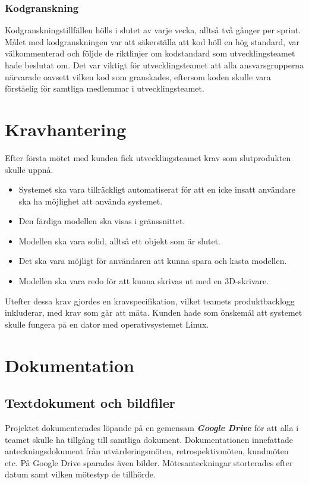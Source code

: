 \documentclass[a4paper,12pt,oneside,final]{extbook}
\begin{document}
\subsubsection{Kodgranskning}
Kodgranskningstillfällen hölls i slutet av varje vecka, alltså två gånger per sprint. Målet med kodgranskningen var att säkerställa att kod höll en hög standard, var välkommenterad och följde de riktlinjer om kodstandard som utvecklingsteamet hade beslutat om. Det var viktigt för utvecklingsteamet att alla ansvarsgrupperna närvarade oavsett vilken kod som granskades, eftersom koden skulle vara förståelig för samtliga medlemmar i utvecklingsteamet.

\section{Kravhantering}
Efter första mötet med kunden fick utvecklingsteamet krav som slutprodukten skulle uppnå.
\begin{itemize}
\item Systemet ska vara tillräckligt automatiserat för att en icke insatt användare ska ha möjlighet att använda systemet.
\item Den färdiga modellen ska visas i gränssnittet.
\item Modellen ska vara solid, alltså ett objekt som är slutet.
\item Det ska vara möjligt för användaren att kunna spara och kasta modellen.
\item Modellen ska vara redo för att kunna skrivas ut med en 3D-skrivare. 
\end{itemize}

Utefter dessa krav gjordes en kravspecifikation, vilket teamets produktbacklogg inkluderar, med krav som går att mäta. Kunden hade som önskemål att systemet skulle fungera på en dator med operativsystemet Linux. 

\section{Dokumentation}
\subsection{Textdokument och bildfiler}
Projektet dokumenterades löpande på en gemensam \emph{\textbf{Google Drive}} för att alla i teamet skulle ha tillgång till samtliga dokument. Dokumentationen innefattade anteckningsdokument från utvärderingsmöten, retrospektivmöten, kundmöten etc. På Google Drive sparades även bilder. Mötesanteckningar storterades efter datum samt vilken mötestyp de tillhörde.
\end{document}
